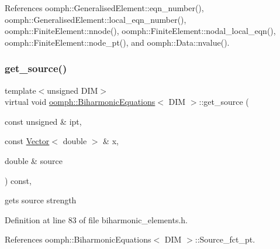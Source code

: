 References oomph\+::\+Generalised\+Element\+::eqn\+\_\+number(), oomph\+::\+Generalised\+Element\+::local\+\_\+eqn\+\_\+number(), oomph\+::\+Finite\+Element\+::nnode(), oomph\+::\+Finite\+Element\+::nodal\+\_\+local\+\_\+eqn(), oomph\+::\+Finite\+Element\+::node\+\_\+pt(), and oomph\+::\+Data\+::nvalue().

\mbox{\label{classoomph_1_1BiharmonicEquations_a38a2cd656bff448e982512af9b85276f}} 
\subsubsection{\texorpdfstring{get\+\_\+source()}{get\_source()}}
{\footnotesize\ttfamily template$<$unsigned D\+IM$>$ \\
virtual void \hyperlink{classoomph_1_1BiharmonicEquations}{oomph\+::\+Biharmonic\+Equations}$<$ D\+IM $>$\+::get\+\_\+source (\begin{DoxyParamCaption}\item[{const unsigned \&}]{ipt,  }\item[{const \hyperlink{classoomph_1_1Vector}{Vector}$<$ double $>$ \&}]{x,  }\item[{double \&}]{source }\end{DoxyParamCaption}) const\hspace{0.3cm}{\ttfamily [inline]}, {\ttfamily [virtual]}}



gets source strength 



Definition at line 83 of file biharmonic\+\_\+elements.\+h.



References oomph\+::\+Biharmonic\+Equations$<$ D\+I\+M $>$\+::\+Source\+\_\+fct\+\_\+pt.

\mbox{\label{classoomph_1_1BiharmonicEquations_a911cb37a410977a094a81dedd8bfcf6d}} 
